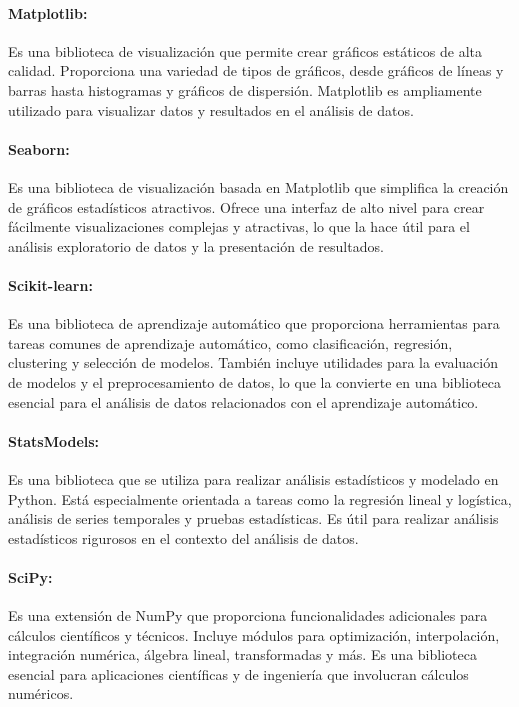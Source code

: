 \paragraph{Matplotlib:}
Es una biblioteca de visualización que permite crear gráficos estáticos de alta calidad. Proporciona una variedad de tipos de gráficos, desde gráficos de líneas y barras hasta histogramas y gráficos de dispersión. Matplotlib es ampliamente utilizado para visualizar datos y resultados en el análisis de datos.

\paragraph{Seaborn:}
Es una biblioteca de visualización basada en Matplotlib que simplifica la creación de gráficos estadísticos atractivos. Ofrece una interfaz de alto nivel para crear fácilmente visualizaciones complejas y atractivas, lo que la hace útil para el análisis exploratorio de datos y la presentación de resultados.

\paragraph{Scikit-learn:}
Es una biblioteca de aprendizaje automático que proporciona herramientas para tareas comunes de aprendizaje automático, como clasificación, regresión, clustering y selección de modelos. También incluye utilidades para la evaluación de modelos y el preprocesamiento de datos, lo que la convierte en una biblioteca esencial para el análisis de datos relacionados con el aprendizaje automático.

\paragraph{StatsModels:}
Es una biblioteca que se utiliza para realizar análisis estadísticos y modelado en Python. Está especialmente orientada a tareas como la regresión lineal y logística, análisis de series temporales y pruebas estadísticas. Es útil para realizar análisis estadísticos rigurosos en el contexto del análisis de datos.

\paragraph{SciPy:}
Es una extensión de NumPy que proporciona funcionalidades adicionales para cálculos científicos y técnicos. Incluye módulos para optimización, interpolación, integración numérica, álgebra lineal, transformadas y más. Es una biblioteca esencial para aplicaciones científicas y de ingeniería que involucran cálculos numéricos.

